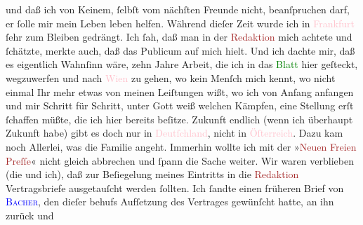               und daß ich von \strikeout{\textcolor{gray}{K}} Keinem, ſelbſt vom nächſten Freunde nicht, beanſpruchen darf, er ſolle mir
               mein Leben leben helfen. Während dieſer Zeit wurde ich in \textcolor{pink}{Frankfurt}{}\ledrightnote{\textcolor{pink}{Frankfurt am Main}} ſehr zum Bleiben gedrängt. Ich ſah, daß  man in der \textcolor{brown}{Redaktion}{} mich achtete und ſchätzte, merkte auch, daß das
               Publicum auf mich hielt. Und ich dachte mir, daß es eigentlich Wahnſinn wäre, zehn
               Jahre Arbeit, die ich in das \textcolor{green}{Blatt}{} hier geſteckt, wegzuwerfen\strikeout{,} und nach
                  \textcolor{pink}{Wien}{}\ledrightnote{\textcolor{pink}{Wien}} zu gehen, wo kein Menſch mich kennt, wo
               nicht einmal Ihr mehr etwas von meinen Leiſtungen wißt, wo ich von Anfang anfangen
                   und mir Schritt für Schritt, unter Gott weiß
               welchen Kämpfen, {\pb}eine Stellung erſt ſchaffen müßte,
               die ich hier bereits beſitze. Zukunft endlich (wenn ich überhaupt Zukunft habe) gibt
               es doch nur in \textcolor{pink}{Deutſchland}{}\ledrightnote{\textcolor{pink}{Deutschland}}, nicht in \textcolor{pink}{Öſterreich}{}\ledrightnote{\textcolor{pink}{Österreich}}. Dazu kam noch Allerlei, was die
               Familie angeht.\pend
           \pstart
           Immerhin wollte ich mit der »\textcolor{brown}{Neuen Freien Preſſe}{}\ledrightnote{\textcolor{brown}{Neue Freie Presse}}«
               nicht gleich \strikeout{\textcolor{gray}{ab}} abbrechen und  ſpann die Sache weiter. Wir waren verblieben (die \label{K_L02868-56v}\label{K_L02868-56h} und ich), daß zur Beſiegelung meines Eintritts in die \textcolor{brown}{Redaktion}{} Vertragsbriefe
               ausgetauſcht werden ſollten. Ich ſandte einen früheren Brief von \textsc{\textcolor{blue}{Bacher}{}\ledrightnote{\textcolor{blue}{Eduard Bacher}}}, den dieſer behufs Aufſetzung des Vertrages gewünſcht hatte, an ihn zurück und
